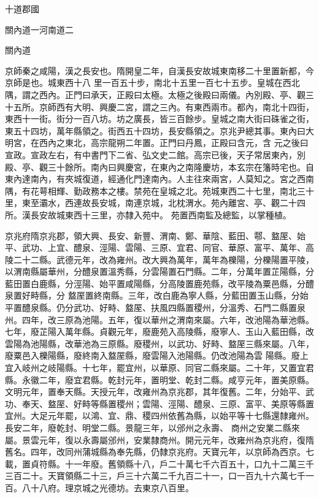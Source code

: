 \begin{pinyinscope}
 十道郡國



 關內道一河南道二



 關內道



 京師秦之咸陽，漢之長安也。隋開皇二年，自漢長安故城東南移二十里置新都，今京師是也。城東西十八
 里一百五十步，南北十五里一百七十五步。皇城在西北隅，謂之西內。正門曰承天，正殿曰太極。太極之後殿曰兩儀。內別殿、亭、觀三十五所。京師西有大明、興慶二宮，謂之三內。有東西兩市。都內，南北十四街，東西十一街。街分一百八坊。坊之廣長，皆三百餘步。皇城之南大街曰硃雀之街，東五十四坊，萬年縣領之。街西五十四坊，長安縣領之。京兆尹總其事。東內曰大明宮，在西內之東北，高宗龍朔二年置。正門曰丹鳳，正殿曰含元，含
 元之後曰宣政。宣政左右，有中書門下二省、弘文史二館。高宗已後，天子常居東內，別殿、亭、觀三十餘所。南內曰興慶宮，在東內之南隆慶坊，本玄宗在籓時宅也。自東內達南內，有夾城復道，經通化門達南內。人主往來兩宮，人莫知之。宮之西南隅，有花萼相輝、勤政務本之樓。禁苑在皇城之北。苑城東西二十七里，南北三十里，東至灞水，西連故長安城，南連京城，北枕渭水。苑內離宮、亭、觀二十四所。漢長安故城東西十三里，亦隸入苑中。
 苑置西南監及總監，以掌種植。



 京兆府隋京兆郡，領大興、長安、新豐、渭南、鄭、華陰、藍田、鄠、盩厔、始平、武功、上宜、醴泉、涇陽、雲陽、三原、宜君、同官、華原、富平、萬年、高陵二十二縣。武德元年，改為雍州。改大興為萬年，萬年為櫟陽，分櫟陽置平陵，以渭南縣屬華州，分醴泉置溫秀縣，分雲陽置石門縣。二年，分萬年置芷陽縣，分藍田置白鹿縣，分涇陽、始平置咸陽縣，分高陵置鹿苑縣，改平陵為粟邑縣，分醴泉置好畤縣，分
 盩厔置終南縣。三年，改白鹿為寧人縣，分藍田置玉山縣，分始平置醴泉縣。仍分武功、好畤、盩厔、扶風四縣置稷州，分溫秀、石門二縣置泉州。四年，改三原為池陽。五年，復以華州之渭南來屬。六年，改池陽為華池縣。七年，廢芷陽入萬年縣。貞觀元年，廢鹿苑入高陵縣，廢寧人、玉山入藍田縣，改雲陽為池陽縣，改華池為三原縣。廢稷州，以武功、好畤、盩厔三縣來屬。八年，廢粟邑入櫟陽縣，廢終南入盩厔縣，廢雲陽入池陽縣。仍改池陽為雲
 陽縣。廢上宜入岐州之岐陽縣。十七年，罷宜州，以華原、同官二縣來屬。二十年，又置宜君縣。永徽二年，廢宜君縣。乾封元年，置明堂、乾封二縣。咸亨元年，置美原縣。文明元年，置奉天縣。天授元年，改雍州為京兆郡，其年復舊。二年，分始平、武功、奉天、盩厔、好畤等縣置稷州；雲陽、涇陽、醴泉、三原、富平、美原等縣置宜州。大足元年罷，以鴻、宜、鼎、稷四州依舊為縣，以始平等十七縣還隸雍州。長安二年，廢乾封、明堂二縣。景龍三年，以邠州之永壽、
 商州之安業二縣來屬。景雲元年，復以永壽屬邠州，安業隸商州。開元元年，改雍州為京兆府，復隋舊名。四年，改同州蒲城縣為奉先縣，仍隸京兆府。天寶元年，以京師為西京。七載，置貞符縣。十一年廢。舊領縣十八，戶二十萬七千六百五十，口九十二萬三千三百二十。天寶領縣二十三，戶三十六萬二千九百二十一，口一百九十六萬七千一百。八十八府。理京城之光德坊。去東京八百里。




\end{pinyinscope}
